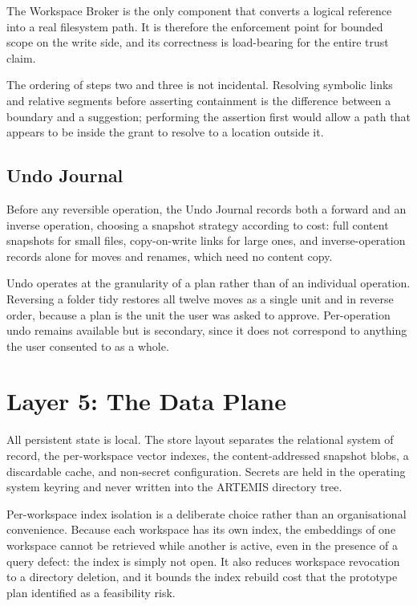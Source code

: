\documentclass[11pt]{article}
\begin{document}
The Workspace Broker is the only component that converts a logical reference into a real
filesystem path. It is therefore the enforcement point for bounded scope on the write
side, and its correctness is load-bearing for the entire trust claim.


The ordering of steps two and three is not incidental. Resolving symbolic links and
relative segments before asserting containment is the difference between a boundary and a
suggestion; performing the assertion first would allow a path that appears to be inside
the grant to resolve to a location outside it.

\subsection{Undo Journal}

Before any reversible operation, the Undo Journal records both a forward and an inverse
operation, choosing a snapshot strategy according to cost: full content snapshots for
small files, copy-on-write links for large ones, and inverse-operation records alone for
moves and renames, which need no content copy.

Undo operates at the granularity of a plan rather than of an individual operation.
Reversing a folder tidy restores all twelve moves as a single unit and in reverse order,
because a plan is the unit the user was asked to approve. Per-operation undo remains
available but is secondary, since it does not correspond to anything the user consented
to as a whole.

\section{Layer 5: The Data Plane}

All persistent state is local. The store layout separates the relational system of
record, the per-workspace vector indexes, the content-addressed snapshot blobs, a
discardable cache, and non-secret configuration. Secrets are held in the operating
system keyring and never written into the ARTEMIS directory tree.

Per-workspace index isolation is a deliberate choice rather than an organisational
convenience. Because each workspace has its own index, the embeddings of one workspace
cannot be retrieved while another is active, even in the presence of a query defect: the
index is simply not open. It also reduces workspace revocation to a directory deletion,
and it bounds the index rebuild cost that the prototype plan identified as a feasibility
risk.
\end{document}
